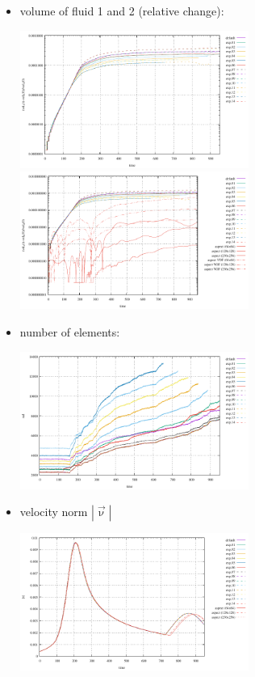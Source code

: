 \begin{itemize}
\item volume of fluid 1 and 2 (relative change):

\begin{center}
\includegraphics[width=7.5cm]{python_codes/fieldstone_95/results/vol1}
\includegraphics[width=7.5cm]{python_codes/fieldstone_95/results/vol2}
\end{center}

\item number of elements: 

\begin{center}
\includegraphics[width=7.5cm]{python_codes/fieldstone_95/results/nel}
\end{center}

\item velocity norm $|\vec\upnu|$
 
\begin{center}
\includegraphics[width=7.5cm]{python_codes/fieldstone_95/results/vel}
\end{center}


\end{itemize}
